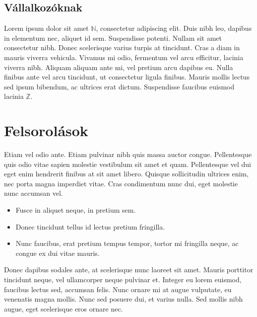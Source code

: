 \subsection{Vállalkozóknak}




















Lorem ipsum dolor sit amet $\mathbb{N}$, consectetur adipiscing elit. Duis nibh leo, dapibus in elementum nec, aliquet id sem. Suspendisse potenti. Nullam sit amet consectetur nibh. Donec scelerisque varius turpis at tincidunt. Cras a diam in mauris viverra vehicula. Vivamus mi odio, fermentum vel arcu efficitur, lacinia viverra nibh. Aliquam aliquam ante mi, vel pretium arcu dapibus eu. Nulla finibus ante vel arcu tincidunt, ut consectetur ligula finibus. Mauris mollis lectus sed ipsum bibendum, ac ultrices erat dictum. Suspendisse faucibus euismod lacinia $\mathbb{Z}$.


\section{Felsorolások} %

Etiam vel odio ante. Etiam pulvinar nibh quis massa auctor congue. Pellentesque quis odio vitae sapien molestie vestibulum sit amet et quam. Pellentesque vel dui eget enim hendrerit finibus at sit amet libero. Quisque sollicitudin ultrices enim, nec porta magna imperdiet vitae. Cras condimentum nunc dui, eget molestie nunc accumsan vel.

\begin{itemize}
	\item Fusce in aliquet neque, in pretium sem.
	\item Donec tincidunt tellus id lectus pretium fringilla.
	\item Nunc faucibus, erat pretium tempus tempor, tortor mi fringilla neque, ac congue ex dui vitae mauris.
\end{itemize}

Donec dapibus sodales ante, at scelerisque nunc laoreet sit amet. Mauris porttitor tincidunt neque, vel ullamcorper neque pulvinar et. Integer eu lorem euismod, faucibus lectus sed, accumsan felis. Nunc ornare mi at augue vulputate, eu venenatis magna mollis. Nunc sed posuere dui, et varius nulla. Sed mollis nibh augue, eget scelerisque eros ornare nec.

